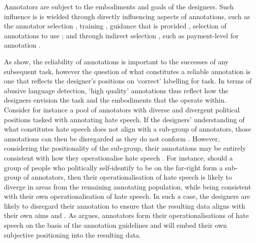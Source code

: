 Annotators  are  subject to the embodiments and goals of the designers.
Such influence is  is wielded  through directly influencing aspects of annotations, such as the annotator selection \citep{Waseem:2016}, training \citep{Vidgen:2020},  guidance that is provided \citep{Palmer:2020},  selection of annotations to use \citep{Hovy:2013}; and through indirect selection , such as payment-level for annotation \citep{Sabou:2014}.

As \citet{Hovy:2013} show, the reliability of annotations is important to the successes of any subsequent task, however the question of what constitutes a reliable annotation is one that reflects the designer's positions on `correct' labelling for  task.
In terms of abusive language detection, `high quality' annotations thus reflect how the designers envision the task  and the embodiments that the  operate within.
Consider for instance a pool of annotators with diverse and divergent political positions tasked with annotating hate speech.
If the designers' understanding of what constitutes hate speech does not align with a sub-group of annotators, those annotations can then be disregarded as they do not conform .
However, considering the positionality of the  sub-group, their annotations may be entirely consistent with how they operationalise hate speech .
For instance, should a group of people who politically self-identify to be on the far-right form a sub-group of annotators, then their operationalisation of hate speech is likely to diverge in  areas from the remaining annotating population, while being consistent with their own operationalisation of hate speech.
In such a case, the designers are likely to disregard their annotation to ensure that the resulting data aligns with their own aims and .
As \citet{Waseem:2016} argues, annotators form their operationalisations of hate speech on the basis of the annotation guidelines and will embed their own subjective positioning into the resulting data.

